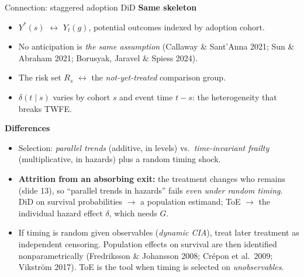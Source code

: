 \documentclass[aspectratio=169,10pt]{beamer}
\newcommand{\1}{\mathbf{1}}
\begin{document}
\begin{frame}{Connection: staggered adoption DiD}
  \textbf{Same skeleton}
  \begin{itemize}
    \item $Y^*(s)$ $\leftrightarrow$ $Y_t(g)$, potential outcomes indexed by adoption cohort.
    \item No anticipation is \emph{the same assumption} (Callaway \& Sant'Anna 2021; Sun \& Abraham 2021; Borusyak, Jaravel \& Spiess 2024).
    \item The risk set $R_s$ $\leftrightarrow$ the \emph{not-yet-treated} comparison group.
    \item $\delta(t\mid s)$ varies by cohort $s$ and event time $t-s$: the heterogeneity that breaks TWFE.
  \end{itemize}
  \textbf{Differences}
  \begin{itemize}
    \item Selection: \emph{parallel trends} (additive, in levels) vs.\ \emph{time-invariant frailty} (multiplicative, in hazards) plus a random timing shock.
    \item \textbf{Attrition from an absorbing exit:} the treatment changes who remains (slide 13), so ``parallel trends in hazards'' fails \emph{even under random timing}.\\
      DiD on survival probabilities $\to$ a population estimand; ToE $\to$ the individual hazard effect $\delta$, which needs $G$.
    \item If timing is random given observables (\emph{dynamic CIA}), treat later treatment as independent censoring. Population effects on survival are then identified nonparametrically (Fredriksson \& Johansson 2008; Crépon et al.\ 2009; Vikström 2017). ToE is the tool when timing is selected on \emph{unobservables}.
  \end{itemize}
\end{frame}
\end{document}
